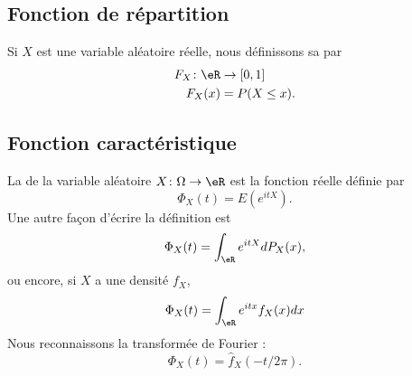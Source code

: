 
\subsection{Fonction de répartition}

Si \( X\) est une variable aléatoire réelle, nous définissons sa  par
\begin{equation}
    \begin{aligned}
        F_X\colon \eR&\to \mathopen[ 0 , 1 \mathclose] \\
        F_X(x)&=P(X\leq x). 
    \end{aligned}
\end{equation}

\subsection{Fonction caractéristique}

La  de la variable aléatoire \( X\colon \Omega\to \eR\) est la fonction réelle définie par
\begin{equation}
    \Phi_X(t)=E( e^{itX}).
\end{equation}
Une autre façon d'écrire la définition est
\begin{equation}
    \Phi_X(t)=\int_{\eR} e^{itX}dP_X(x),
\end{equation}
ou encore, si \( X\) a une densité \( f_X\),
\begin{equation}        \label{EqFnCaractfncadens}
    \Phi_X(t)=\int_{\eR} e^{itx}f_X(x)dx
\end{equation}
Nous reconnaissons la transformée de Fourier :
\begin{equation}
    \Phi_X(t)=\hat f_X(-t/2\pi).
\end{equation}


